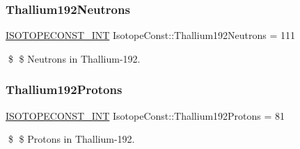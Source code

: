 \subsubsection{\texorpdfstring{Thallium192\+Neutrons}{Thallium192Neutrons}}
{\footnotesize\ttfamily \mbox{\hyperlink{group___isotope_const-_macros_ga5f18360b3e99483a35c32d789e62621c}{I\+S\+O\+T\+O\+P\+E\+C\+O\+N\+S\+T\+\_\+\+I\+NT}} Isotope\+Const\+::\+Thallium192\+Neutrons = 111}

\$ \$ Neutrons in Thallium-\/192. \mbox{\label{group___isotope_const-_thallium-_tl192_gac7001d1549bc49affd17fac6680f4f4a}} 
\subsubsection{\texorpdfstring{Thallium192\+Protons}{Thallium192Protons}}
{\footnotesize\ttfamily \mbox{\hyperlink{group___isotope_const-_macros_ga5f18360b3e99483a35c32d789e62621c}{I\+S\+O\+T\+O\+P\+E\+C\+O\+N\+S\+T\+\_\+\+I\+NT}} Isotope\+Const\+::\+Thallium192\+Protons = 81}

\$ \$ Protons in Thallium-\/192. 